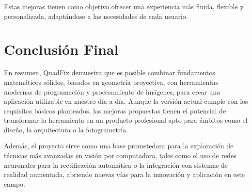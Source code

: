 Estas mejoras tienen como objetivo ofrecer una experiencia más fluida, flexible y personalizada, adaptándose a las necesidades de cada usuario.

\section{Conclusión Final}

En resumen, QuadFix demuestra que es posible combinar fundamentos matemáticos sólidos, basados en geometría proyectiva, con herramientas modernas de programación y procesamiento de imágenes, para crear una aplicación utilizable en nuestro día a día. Aunque la versión actual cumple con los requisitos básicos planteados, las mejoras propuestas tienen el potencial de transformar la herramienta en un producto profesional apto para ámbitos como el diseño, la arquitectura o la fotogrametría.

Además, el proyecto sirve como una base prometedora para la exploración de técnicas más avanzadas en visión por computadora, tales como el uso de redes neuronales para la rectificación automática o la integración con sistemas de realidad aumentada, abriendo nuevas vías para la innovación y aplicación en este campo.
